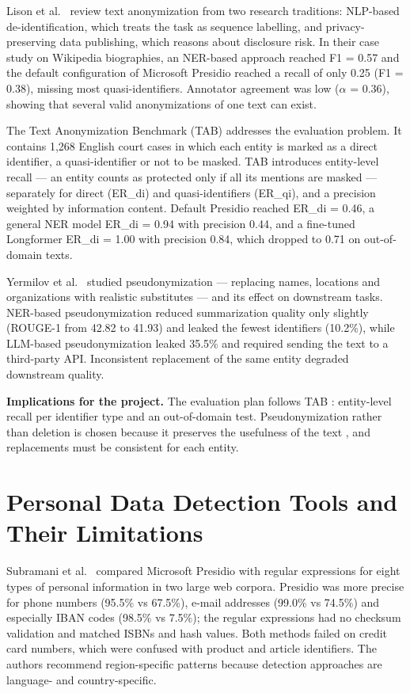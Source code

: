 \documentclass[12pt,a4paper]{article}
\begin{document}
Lison et al.~\cite{r4} review text anonymization from two research traditions: NLP-based de-identification, which treats the task as sequence labelling, and privacy-preserving data publishing, which reasons about disclosure risk. In their case study on Wikipedia biographies, an NER-based approach reached F1 = 0.57 and the default configuration of Microsoft Presidio reached a recall of only 0.25 (F1 = 0.38), missing most quasi-identifiers. Annotator agreement was low ($\alpha$ = 0.36), showing that several valid anonymizations of one text can exist.

The Text Anonymization Benchmark (TAB) \cite{r5} addresses the evaluation problem. It contains 1,268 English court cases in which each entity is marked as a direct identifier, a quasi-identifier or not to be masked. TAB introduces entity-level recall --- an entity counts as protected only if all its mentions are masked --- separately for direct (ER\_di) and quasi-identifiers (ER\_qi), and a precision weighted by information content. Default Presidio reached ER\_di = 0.46, a general NER model ER\_di = 0.94 with precision 0.44, and a fine-tuned Longformer ER\_di = 1.00 with precision 0.84, which dropped to 0.71 on out-of-domain texts.

Yermilov et al.~\cite{r6} studied pseudonymization --- replacing names, locations and organizations with realistic substitutes --- and its effect on downstream tasks. NER-based pseudonymization reduced summarization quality only slightly (ROUGE-1 from 42.82 to 41.93) and leaked the fewest identifiers (10.2\%), while LLM-based pseudonymization leaked 35.5\% and required sending the text to a third-party API. Inconsistent replacement of the same entity degraded downstream quality.

\textbf{Implications for the project.} The evaluation plan follows TAB \cite{r5}: entity-level recall per identifier type and an out-of-domain test. Pseudonymization rather than deletion is chosen because it preserves the usefulness of the text \cite{r6}, and replacements must be consistent for each entity.

\section{Personal Data Detection Tools and Their Limitations}

Subramani et al.~\cite{r7} compared Microsoft Presidio with regular expressions for eight types of personal information in two large web corpora. Presidio was more precise for phone numbers (95.5\% vs 67.5\%), e-mail addresses (99.0\% vs 74.5\%) and especially IBAN codes (98.5\% vs 7.5\%); the regular expressions had no checksum validation and matched ISBNs and hash values. Both methods failed on credit card numbers, which were confused with product and article identifiers. The authors recommend region-specific patterns because detection approaches are language- and country-specific.
\end{document}
